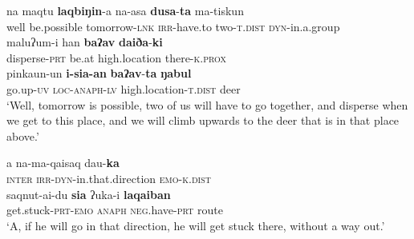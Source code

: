 \documentclass[output=paper
,modfonts
,nonflat]{langsci/langscibook}
\begin{document}
\begin{exe}
	\label{tx1-2}
	\begin{xlist}
		\ex\label{tx1-2a}
		\gll na  maqtu  \textbf{laqbiŋin}-a  na-asa  \textbf{dusa}-\textbf{ta}   ma-tiskun\\
		well  be.possible  tomorrow-\textsc{lnk}  \textsc{irr}-have.to  two-\textsc{t}.\textsc{dist}  \textsc{dyn}-in.a.group\\
		\ex\label{tx1-2b}
		\gll maluʔum-i  han  \textbf{baʔav}  \textbf{daiða}{}-\textbf{ki}\\
		disperse-\textsc{prt}  be.at  high.location  there-\textsc{k}.\textsc{prox}\\
		\ex\label{tx1-2c}
		\gll pinkaun-un  \textbf{i-sia-an}  \textbf{baʔav}{}-\textbf{ta}  \textbf{ŋabul}\\
		go.up-\textsc{uv}  \textsc{loc}{}-\textsc{anaph}{}-\textsc{lv}  high.location-\textsc{t}.\textsc{dist}  deer\\
		\glt `Well, tomorrow is possible, two of us will have to go together, and disperse when we get to this place, and we will climb upwards to the deer that is in that place above.’
	\end{xlist}
\end{exe}

\begin{exe}
	\label{tx1-3}
	\begin{xlist}
		\ex\label{tx1-3a}
		\gll a  na-ma-qaisaq  dau-\textbf{ka}\\
		\textsc{inter}  \textsc{irr}-\textsc{dyn}-in.that.direction  \textsc{emo}-\textsc{k}.\textsc{dist}\\
		\ex\label{tx1-3b}
		\gll saqnut-ai-du  \textbf{sia}  ʔuka-i  \textbf{laqaiban}\\
		get.stuck-\textsc{prt}-\textsc{emo}  \textsc{anaph}  \textsc{neg}.have-\textsc{prt}  route\\
		\glt `A, if he will go in that direction, he will get stuck there, without a way out.’
	\end{xlist}
\end{exe}
\end{document}
